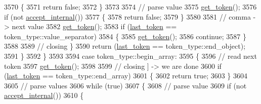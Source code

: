 \begin{DoxyCode}
3570                     \{
3571                         \textcolor{keywordflow}{return} \textcolor{keyword}{false};
3572                     \}
3573 
3574                     \textcolor{comment}{// parse value}
3575                     \hyperlink{classnlohmann_1_1detail_1_1parser_a33f3859d0dd402445b5859070fd24bab}{get\_token}();
3576                     \textcolor{keywordflow}{if} (not \hyperlink{classnlohmann_1_1detail_1_1parser_ae74703484283dbb328277a6f8c559bf8}{accept\_internal}())
3577                     \{
3578                         \textcolor{keywordflow}{return} \textcolor{keyword}{false};
3579                     \}
3580 
3581                     \textcolor{comment}{// comma -> next value}
3582                     \hyperlink{classnlohmann_1_1detail_1_1parser_a33f3859d0dd402445b5859070fd24bab}{get\_token}();
3583                     \textcolor{keywordflow}{if} (\hyperlink{classnlohmann_1_1detail_1_1parser_a932e49f6f4d291557846744319245994}{last\_token} == token\_type::value\_separator)
3584                     \{
3585                         \hyperlink{classnlohmann_1_1detail_1_1parser_a33f3859d0dd402445b5859070fd24bab}{get\_token}();
3586                         \textcolor{keywordflow}{continue};
3587                     \}
3588 
3589                     \textcolor{comment}{// closing \}}
3590                     \textcolor{keywordflow}{return} (\hyperlink{classnlohmann_1_1detail_1_1parser_a932e49f6f4d291557846744319245994}{last\_token} == token\_type::end\_object);
3591                 \}
3592             \}
3593 
3594             \textcolor{keywordflow}{case} token\_type::begin\_array:
3595             \{
3596                 \textcolor{comment}{// read next token}
3597                 \hyperlink{classnlohmann_1_1detail_1_1parser_a33f3859d0dd402445b5859070fd24bab}{get\_token}();
3598 
3599                 \textcolor{comment}{// closing ] -> we are done}
3600                 \textcolor{keywordflow}{if} (\hyperlink{classnlohmann_1_1detail_1_1parser_a932e49f6f4d291557846744319245994}{last\_token} == token\_type::end\_array)
3601                 \{
3602                     \textcolor{keywordflow}{return} \textcolor{keyword}{true};
3603                 \}
3604 
3605                 \textcolor{comment}{// parse values}
3606                 \textcolor{keywordflow}{while} (\textcolor{keyword}{true})
3607                 \{
3608                     \textcolor{comment}{// parse value}
3609                     \textcolor{keywordflow}{if} (not \hyperlink{classnlohmann_1_1detail_1_1parser_ae74703484283dbb328277a6f8c559bf8}{accept\_internal}())
3610                     \{

\end{DoxyCode}
